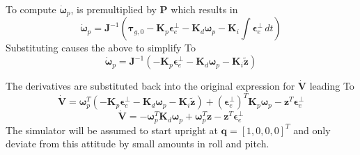 To compute $\dot{\bm{\omega}}_p$,  is premultiplied by $\bm{P}$ which results in
\begin{equation}
    \dot{\bm{\omega}}_p = \bm{J}^{-1}(\bm{\tau}_{g,0}
        -\bm{K}_p\bm{\epsilon}_e^\perp - \bm{K}_d\bm{\omega}_p
         -\bm{K}_i\int\bm{\epsilon}_e^\perp\,dt)
\end{equation}
Substituting  causes the above to simplify To
\begin{equation}\label{equation:simplified_omega_p}
    \dot{\bm{\omega}}_p = \bm{J}^{-1}(
        -\bm{K}_p\bm{\epsilon}_e^\perp - \bm{K}_d\bm{\omega}_p
        -\bm{K}_i\tilde{\bm{z}})
\end{equation}

The derivatives are substituted back into the original expression for $\dot{\bm{V}}$ leading To
\begin{equation}
    \dot{\bm{V}}=\bm{\omega}_p^T(
    -\bm{K}_p\bm{\epsilon}_e^\perp - \bm{K}_d\bm{\omega}_p -\bm{K}_i\tilde{\bm{z}})
    + (\bm{\epsilon}_e^\perp)^T\bm{K}_p\bm{\omega}_p
    - \bm{z}^T\bm{\epsilon}_e^\perp
\end{equation}
\begin{equation}
    \dot{\bm{V}}=-\bm{\omega}_p^T\bm{K}_d\bm{\omega}_p + \bm{\omega}_p^T\bm{z}
    - \bm{z}^T\bm{\epsilon}_e^\perp
\end{equation}
The simulator will be assumed to start upright at $\bm{q} = [1, 0, 0, 0]^T$ and only deviate from this attitude by small amounts in roll and pitch. 